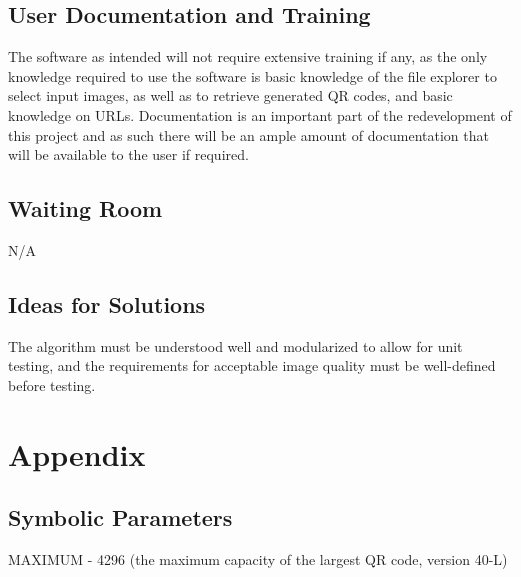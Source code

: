 \documentclass[12pt, titlepage]{article}
\begin{document}
\subsection{User Documentation and Training}

	The software as intended will not require extensive training if any, as the 
	only knowledge required to use the software is basic knowledge of the file 
	explorer to select input images, as well as to retrieve generated QR codes, 
	and basic knowledge on URLs. Documentation is an important part of the 
	redevelopment of this project and as such there will be an ample amount of 
	documentation that will be available to the user if required.

\subsection{Waiting Room}
	
	N/A
	
\subsection{Ideas for Solutions}

	The algorithm must be understood well and modularized to allow for unit 
	testing, and the requirements for acceptable image quality must be 
	well-defined before testing.





\newpage

\section{Appendix}


\subsection{Symbolic Parameters}

MAXIMUM - 4296 (the maximum capacity of the largest QR code, version 40-L)
\end{document}
